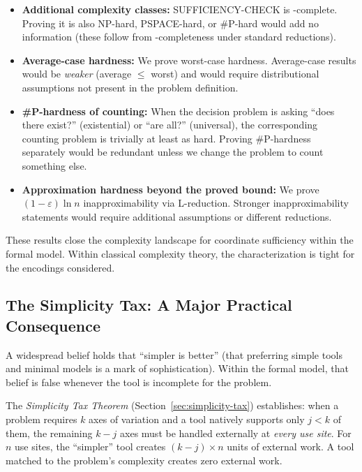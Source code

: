 \begin{itemize}
\item \textbf{Additional complexity classes:} SUFFICIENCY-CHECK is \coNP-complete. Proving it is also NP-hard, PSPACE-hard, or \#P-hard would add no information (these follow from \coNP-completeness under standard reductions).

\item \textbf{Average-case hardness:} We prove worst-case hardness. Average-case results would be \emph{weaker} (average $\leq$ worst) and would require distributional assumptions not present in the problem definition.

\item \textbf{\#P-hardness of counting:} When the decision problem is asking ``does there exist?'' (existential) or ``are all?'' (universal), the corresponding counting problem is trivially at least as hard. Proving \#P-hardness separately would be redundant unless we change the problem to count something else.

\item \textbf{Approximation hardness beyond the proved bound:} We prove $(1-\varepsilon)\ln n$ inapproximability via L-reduction. Stronger inapproximability statements would require additional assumptions or different reductions.
\end{itemize}

These results close the complexity landscape for coordinate sufficiency within the formal model. Within classical complexity theory, the characterization is tight for the encodings considered.

\subsection*{The Simplicity Tax: A Major Practical Consequence}

A widespread belief holds that ``simpler is better'' (that preferring simple tools and minimal models is a mark of sophistication). Within the formal model, that belief is false whenever the tool is incomplete for the problem.

The \emph{Simplicity Tax Theorem} (Section~\ref{sec:simplicity-tax}) establishes: when a problem requires $k$ axes of variation and a tool natively supports only $j < k$ of them, the remaining $k - j$ axes must be handled externally at \emph{every use site}. For $n$ use sites, the ``simpler'' tool creates $(k-j) \times n$ units of external work. A tool matched to the problem's complexity creates zero external work.

